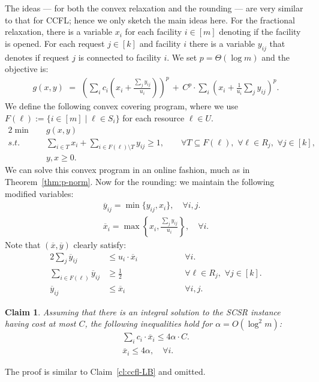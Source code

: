 \documentclass[letterpaper,11pt]{article}
\newtheorem{claim}[thm]{Claim}
\newcommand{\ox}{\ensuremath{\overline{x}}\xspace}
\newcommand{\oy}{\ensuremath{\overline{y}}\xspace}
\def\oy{\overline{y}}
\def\ox{\overline{x}}
\def\sse{\subseteq}
\begin{document}
The ideas --- for both the convex relaxation and the rounding --- are
very similar to that for CCFL; hence we only sketch the main ideas
here. For the fractional relaxation, there is a variable $x_i$ for each
facility $i\in[m]$ denoting if the facility is opened. For each request
$j\in[k]$ and facility $i$ there is a variable $y_{ij}$ that denotes if
request $j$ is connected to facility $i$. We set $p=\Theta(\log m)$ and
the objective is:
\begin{gather*}
  g(x,y) \,\,=\,\, \left(\sum_{i}^{}c_i \left(x_i + \frac{\sum_j
        y_{ij}}{u_i}\right)\right)^p \,+\, C^p \cdot \sum_{i}^{} \left(
    x_i + \frac{1}{u_i} \sum_{j}^{ }y_{ij}\right)^p.
\end{gather*}
We define the following convex covering program, where we use
$F(\ell):=\{i\in[m] \mid \ell\in S_i\}$ for each resource $\ell\in U$.
\begin{alignat*}{2}
  \min & \quad g(x,y)\\
  s.t. & \quad \sum_{i\in T} x_i + \sum_{i\in F(\ell)\setminus T}y_{ij}
  \geq 1, \qquad \forall T\sse F(\ell),\,\, \forall \ell\in R_j,\,\,
  \forall j\in [k],\\
  &\quad y, x \geq 0.
\end{alignat*}
We can solve this convex program in an online fashion, much as in
Theorem~\ref{thm:p-norm}. Now for the rounding: we maintain the
following modified variables:
\begin{gather*}
  \overline{y}_{ij}=\min\{y_{ij},x_i\}, \quad \forall i,j. \\
\ox_i = \max\left\{ x_i, \frac{\sum_j y_{ij}}{u_i} \right\},\quad \forall i.
\end{gather*}
Note that $(\ox,\oy)$ clearly satisfy:
\begin{alignat}{2}
  \sum_j \oy_{ij} &\le u_i\cdot \ox_i & \qquad\qquad & \forall i.
  \label{eq:scsr:1} \\
  \sum_{i\in F(\ell)} \oy_{ij} &\ge \frac12 && \forall \ell\in R_j,\,\,
  \forall j\in [k].
  \label{eq:scsr:2} \\
  \oy_{ij} &\le \ox_i && \forall i, j.
  \label{eq:scsr:3}
\end{alignat}

\begin{claim}\label{cl:scsr-LB}
  Assuming that there is an integral solution to the SCSR instance
  having cost at most $C$, the following inequalities hold for
  $\alpha=O(\log^2m)$:
  \begin{gather}
    \sum_i c_i\cdot \ox_i \le 4\alpha \cdot C.
    \label{eq:scsr:4}\\
    \ox_{i} \le 4\alpha,\quad \forall i.
    \label{eq:scsr:6}
  \end{gather}
\end{claim}
The proof is similar to Claim~\ref{cl:ccfl-LB} and omitted.
\end{document}
